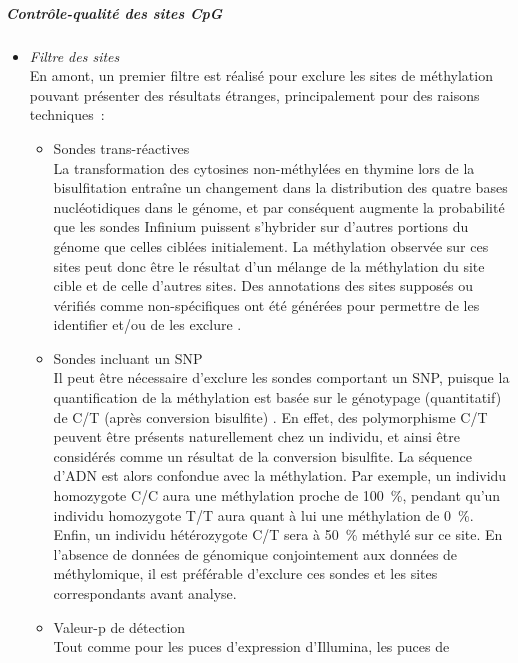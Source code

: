 \documentclass[11pt,a4paper,notrimn]{krantz}
\let\oldsubparagraph\subparagraph
\renewcommand{\subparagraph}[1]{\oldsubparagraph{#1}\mbox{}}
\theoremstyle{definition}
\theoremstyle{definition}
\theoremstyle{remark}
\begin{document}
\subparagraph{Contrôle-qualité des sites
CpG}\label{controle-qualite-des-sites-cpg}

\begin{itemize}
\item
  \emph{Filtre des sites}\\
  En amont, un premier filtre est réalisé pour exclure les sites de
  méthylation pouvant présenter des résultats étranges, principalement
  pour des raisons techniques~:

  \begin{itemize}
  \item
    Sondes trans-réactives\\
    La transformation des cytosines non-méthylées en thymine lors de la
    bisulfitation entraîne un changement dans la distribution des quatre
    bases nucléotidiques dans le génome, et par conséquent augmente la
    probabilité que les sondes Infinium puissent s'hybrider sur d'autres
    portions du génome que celles ciblées initialement. La méthylation
    observée sur ces sites peut donc être le résultat d'un mélange de la
    méthylation du site cible et de celle d'autres sites. Des
    annotations des sites supposés ou vérifiés comme non-spécifiques ont
    été générées pour permettre de les identifier et/ou de les exclure
    \citep{price_additional_2013, zhang_analysis_2012, chen_discovery_2013}.
  \item
    Sondes incluant un SNP\\
    Il peut être nécessaire d'exclure les sondes comportant un SNP,
    puisque la quantification de la méthylation est basée sur le
    génotypage (quantitatif) de C/T (après conversion bisulfite)
    \citep{price_additional_2013, chen_discovery_2013}. En effet, des
    polymorphisme C/T peuvent être présents naturellement chez un
    individu, et ainsi être considérés comme un résultat de la
    conversion bisulfite. La séquence d'ADN est alors confondue avec la
    méthylation. Par exemple, un individu homozygote C/C aura une
    méthylation proche de 100~\%, pendant qu'un individu homozygote T/T
    aura quant à lui une méthylation de 0~\%. Enfin, un individu
    hétérozygote C/T sera à 50~\% méthylé sur ce site. En l'absence de
    données de génomique conjointement aux données de méthylomique, il
    est préférable d'exclure ces sondes et les sites correspondants
    avant analyse.
  \item
    Valeur-p de détection\\
    Tout comme pour les puces d'expression d'Illumina, les puces de

\end{itemize}
\end{itemize}
\end{document}
